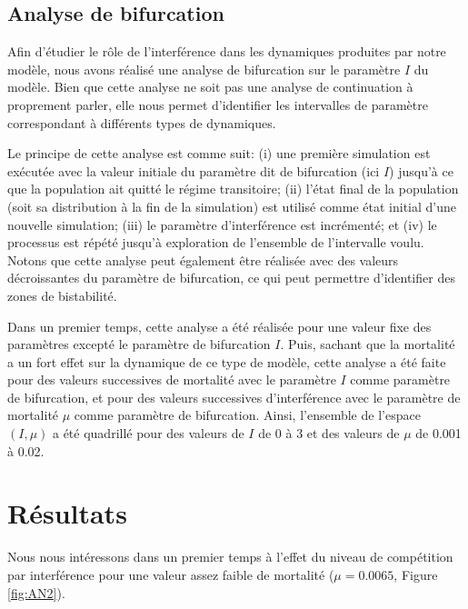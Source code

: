 \subsection{Analyse de bifurcation}

Afin d'étudier le rôle de l'interférence dans les dynamiques produites par notre
modèle, nous avons réalisé une analyse de bifurcation sur le paramètre $I$ du
modèle. Bien que cette analyse ne soit pas une analyse de continuation à
proprement parler, elle nous permet d'identifier les intervalles de paramètre
correspondant à différents types de dynamiques. 

Le principe de cette analyse est comme suit: (i) une première simulation est
exécutée avec la valeur initiale du paramètre dit de bifurcation (ici $I$)
jusqu'à ce que la population ait quitté le régime transitoire; (ii) l'état final
de la population (soit sa distribution à la fin de la simulation) est utilisé
comme état initial d'une nouvelle simulation; (iii) le paramètre d'interférence
est incrémenté; et (iv) le processus est répété jusqu'à exploration de
l'ensemble de l'intervalle voulu. Notons que cette analyse peut également être
réalisée avec des valeurs décroissantes du paramètre de bifurcation, ce qui peut
permettre d'identifier des zones de bistabilité. 

Dans un premier temps, cette analyse a été réalisée pour une valeur fixe des
paramètres excepté le paramètre de bifurcation $I$. Puis, sachant que la
mortalité a un fort effet sur la dynamique de ce type de modèle, cette analyse
a été faite pour des valeurs successives de mortalité avec le paramètre $I$
comme paramètre de bifurcation, et pour des valeurs successives d'interférence
avec le paramètre de mortalité $\mu$ comme paramètre de bifurcation. Ainsi,
l'ensemble de l'espace $(I,\mu)$ a été quadrillé pour des valeurs de $I$ de 0 à
3 et des valeurs de $\mu$ de 0.001 à 0.02.

\section{Résultats}

Nous nous intéressons dans un premier temps à l'effet du niveau de compétition
par interférence pour une valeur assez faible de mortalité ($\mu = 0.0065$,
Figure \ref{fig:AN2}). 

